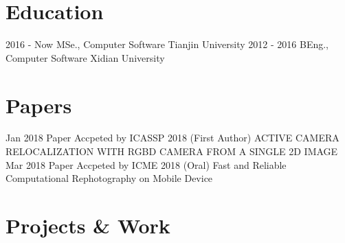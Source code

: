 \documentclass[utf8]{twentysecondcv} %
\begin{document}
\makeprofile %

\section{Education}

\begin{twentyshort}
    \twentyitemshort
        {2016 - Now}
        {MSe., Computer Software \hfill{Tianjin University}}	
	\twentyitemshort
		{2012 - 2016}
		{BEng., Computer Software \hfill{Xidian University}}		
\end{twentyshort}


\section{Papers}

\begin{twenty}
    \twentyitem
        {Jan 2018}
        {}        
        {Paper Accpeted by ICASSP 2018 (First Author)}
        {}
        {}
        {ACTIVE CAMERA RELOCALIZATION WITH RGBD CAMERA
FROM A SINGLE 2D IMAGE}
    \twentyitem
        {Mar 2018}
        {}        
        {Paper Accpeted by ICME 2018 (Oral)}
        {}
        {}
        {Fast and Reliable Computational Rephotography on Mobile Device}
\end{twenty}

\section{Projects \& Work}
\end{document}
